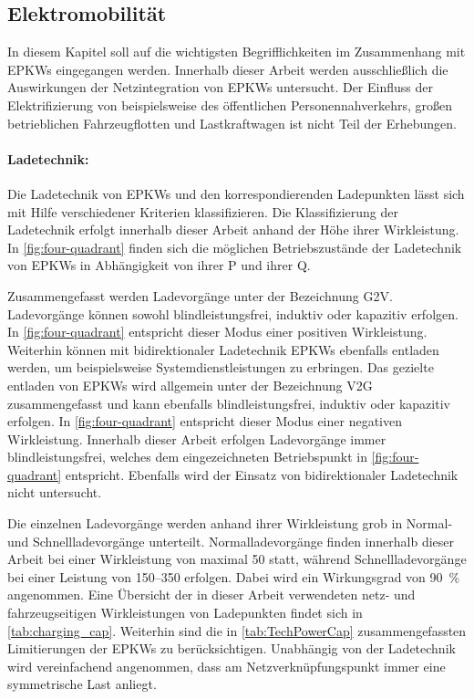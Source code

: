 \subsection{Elektromobilität}

In diesem Kapitel soll auf die wichtigsten Begrifflichkeiten im Zusammenhang mit \glspl{EPKW} eingegangen werden.
Innerhalb dieser Arbeit werden ausschließlich die Auswirkungen der Netzintegration von \glspl{EPKW} untersucht.
Der Einfluss der Elektrifizierung von beispielsweise des öffentlichen Personennahverkehrs, großen betrieblichen Fahrzeugflotten und Lastkraftwagen ist nicht Teil der Erhebungen.


\paragraph{Ladetechnik:}

Die Ladetechnik von \glspl{EPKW} und den korrespondierenden Ladepunkten lässt sich mit Hilfe verschiedener Kriterien klassifizieren.
Die Klassifizierung der Ladetechnik erfolgt innerhalb dieser Arbeit anhand der Höhe ihrer Wirkleistung.
In \autoref{fig:four-quadrant} finden sich die möglichen Betriebszustände der Ladetechnik von \glspl{EPKW} in Abhängigkeit von ihrer \gls{P} und ihrer \gls{Q}. \medskip

Zusammengefasst werden Ladevorgänge unter der Bezeichnung \gls{G2V}.
Ladevorgänge können sowohl blindleistungsfrei, induktiv oder kapazitiv erfolgen.
In \autoref{fig:four-quadrant} entspricht dieser Modus einer positiven Wirkleistung.
Weiterhin können mit bidirektionaler Ladetechnik \glspl{EPKW} ebenfalls entladen werden, um beispielsweise Systemdienstleistungen zu erbringen.
Das gezielte entladen von \glspl{EPKW} wird allgemein unter der Bezeichnung \gls{V2G} zusammengefasst und kann ebenfalls blindleistungsfrei, induktiv oder kapazitiv erfolgen.
In \autoref{fig:four-quadrant} entspricht dieser Modus einer negativen Wirkleistung. \cite{He2020} 
Innerhalb dieser Arbeit erfolgen Ladevorgänge immer blindleistungsfrei, welches dem eingezeichneten Betriebspunkt in \autoref{fig:four-quadrant} entspricht.
Ebenfalls wird der Einsatz von bidirektionaler Ladetechnik nicht untersucht.



Die einzelnen Ladevorgänge werden anhand ihrer Wirkleistung grob in Normal- und Schnellladevorgänge unterteilt.
Normalladevorgänge finden innerhalb dieser Arbeit bei einer Wirkleistung von maximal \SI{50}{\kw} statt, während Schnellladevorgänge bei einer Leistung von \SIrange[range-phrase=~{oder}~]{150}{350}{\kw} erfolgen.
Dabei wird ein Wirkungsgrad von \SI{90}{\percent} \cite{EliaGroup2020} angenommen.
Eine Übersicht der in dieser Arbeit verwendeten netz- und fahrzeugseitigen Wirkleistungen von Ladepunkten findet sich in \autoref{tab:charging_cap}.
Weiterhin sind die in \autoref{tab:TechPowerCap} zusammengefassten Limitierungen der \glspl{EPKW} zu berücksichtigen.
Unabhängig von der Ladetechnik wird vereinfachend angenommen, dass am Netzverknüpfungspunkt immer eine symmetrische Last anliegt.

